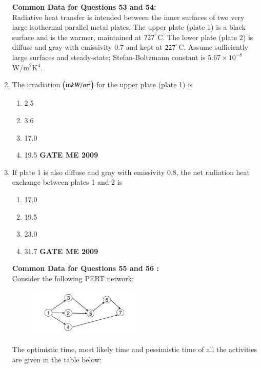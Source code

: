 \documentclass[journal]{IEEEtran}
\begin{document}
\begin{enumerate}[leftmargin=0pt]
\textbf{Common Data for Questions 53 and 54:}\\
Radiative heat transfer is intended between the inner surfaces of two very large isothermal parallel metal plates. The upper plate (plate 1) is a black surface and is the warmer, maintained at $727^{\degree}$C. The lower plate (plate 2) is diffuse and gray with emissivity 0.7 and kept at $227^{\degree}$C. Assume sufficiently large surfaces and steady-state; Stefan-Boltzmann constant is $5.67 \times 10^{-8}$ W/m$^2$K$^4$.
\item The irradiation $\left(\text{in} kW/m^2\right)$ for the upper plate (plate 1) is
\begin{enumerate}[label=(\Alph*)]
  \item 2.5
  \item 3.6
  \item 17.0
  \item 19.5
\hfill{\textbf{GATE ME 2009}}
\end{enumerate}
\item If plate 1 is also diffuse and gray with emissivity 0.8, the net radiation heat exchange  between plates 1 and 2 is
\begin{enumerate}[label=(\Alph*)]
  \item 17.0
  \item 19.5
  \item 23.0
  \item 31.7
\hfill{\textbf{GATE ME 2009}}
\end{enumerate}
\textbf{Common Data for Questions 55 and 56 :}\\
Consider the following PERT network:
\begin{figure}[h]
  \centering
  \includegraphics[width=0.5\textwidth]{Figs/image (12).png}
  \caption{}
\end{figure}
The optimistic time, most likely time and pessimistic time of all the activities are given in the table below:\\
\begin{table}[h]
    \centering
    
   
\end{table}



\end{enumerate}
\end{document}
